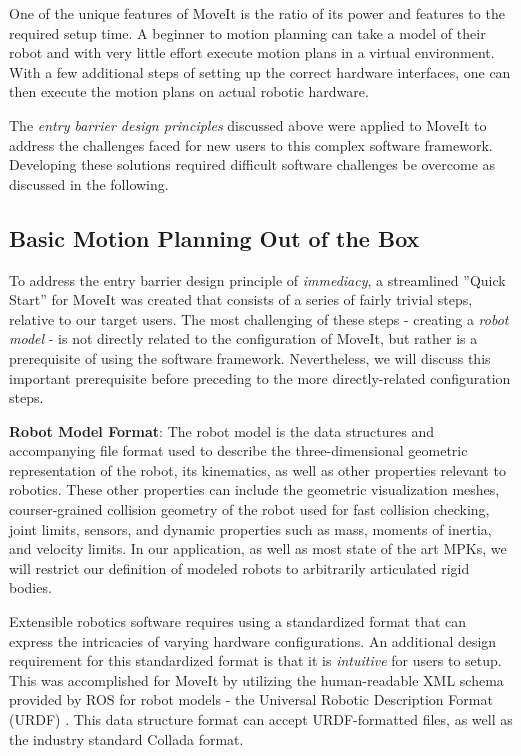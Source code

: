 \documentclass[10pt,journal,compsoc]{joser1}
\begin{document}
{One of the unique features of MoveIt is the ratio of its power and features to the required setup time. A beginner to motion planning can take a model of their robot and with very little effort execute motion plans in a virtual environment. With a few additional steps of setting up the correct hardware interfaces, one can then execute the motion plans on actual robotic hardware.

The \textit{entry barrier design principles} discussed above were applied to MoveIt to address the challenges faced for new users to this complex software framework. Developing these solutions required difficult software challenges be overcome as discussed in the following.

\subsection{Basic Motion Planning Out of the Box}

To address the entry barrier design principle of \textit{immediacy}, a streamlined ''Quick Start'' for MoveIt was created that consists of a series of fairly trivial steps, relative to our target users. The most challenging of these steps - creating a \textit{robot model} - is not directly related to the configuration of MoveIt, but rather is a prerequisite of using the software framework. Nevertheless, we will discuss this important prerequisite before preceding to the more directly-related configuration steps. 

{\bf Robot Model Format}: The robot model is the data structures and accompanying file format used to describe the three-dimensional geometric representation of the robot, its kinematics, as well as other properties relevant to robotics. These other properties can include the geometric visualization meshes, courser-grained collision geometry of the robot used for fast collision checking, joint limits, sensors, and dynamic properties such as mass, moments of inertia, and velocity limits. In our application, as well as most state of the art MPKs, we will restrict our definition of modeled robots to arbitrarily articulated rigid bodies.

Extensible robotics software requires using a standardized format that can express the intricacies of varying hardware configurations. An additional design requirement for this standardized format is that it is \textit{intuitive} for users to setup. This was accomplished for MoveIt by utilizing the human-readable XML schema provided by ROS for robot models - the Universal Robotic Description Format (URDF) \cite{urdf}. This data structure format can accept URDF-formatted files, as well as the industry standard Collada \cite{collada} format.

}
\end{document}
